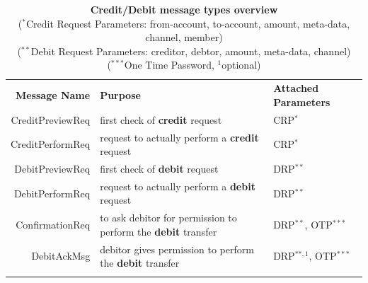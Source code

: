 \begin{table}[H]
\begin{centering}
\small
{
\begin{tabular}{ r | p{7cm} | p{4cm} }
\hline
\textbf{Message Name} & \textbf{Purpose} & \textbf{Attached Parameters} \\
\Xhline{1.5pt}

CreditPreviewReq & first check of \textbf{credit} request & CRP$^{*}$ \\[3pt]
\hline
CreditPerformReq & request to actually perform a \textbf{credit} request & CRP$^{*}$ \\[3pt]
\Xhline{1.5pt}
DebitPreviewReq & first check of \textbf{debit} request & DRP$^{**}$ \\[3pt]
\hline
DebitPerformReq & request to actually perform a \textbf{debit} request & DRP$^{**}$ \\[3pt]
\hline
ConfirmationReq & to ask debitor for permission to perform the \textbf{debit} transfer & DRP$^{**}$, OTP$^{***}$ \\[3pt]
\hline
DebitAckMsg & debitor gives permission to perform the \textbf{debit} transfer & DRP$^{**, 1}$, OTP$^{***}$ \\[3pt]

\Xhline{1.5pt}
\end{tabular}
}
\caption{\small\textbf{Credit/Debit message types overview}\\
($^{*}$Credit Request Parameters: from-account, to-account, amount, meta-data, channel, member)\\
($^{**}$Debit Request Parameters:  creditor, debtor, amount, meta-data, channel)\\
($^{***}$One Time Password, $^1$optional)}
\label{tab:impl-transfer-types}
\end{centering}
\vspace{-0.5cm}
\end{table}

